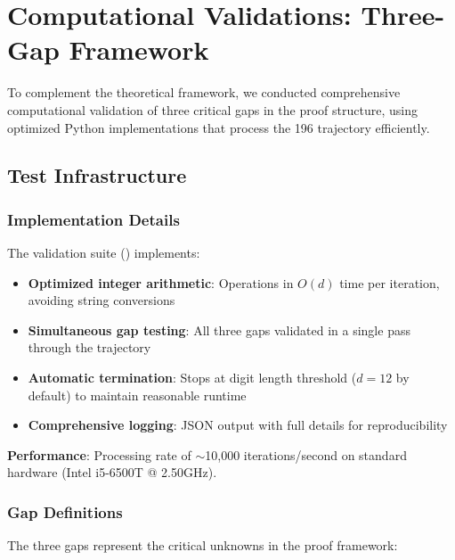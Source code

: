 \documentclass[12pt,a4paper]{article}
\begin{document}
\section{Computational Validations: Three-Gap Framework}
\label{sec:three_gap_validation}

To complement the theoretical framework, we conducted comprehensive 
computational validation of three critical gaps in the proof structure, 
using optimized Python implementations that process the 196 trajectory 
efficiently.

\subsection{Test Infrastructure}

\subsubsection{Implementation Details}

The validation suite (\texttt{}) implements:

\begin{itemize}
\item \textbf{Optimized integer arithmetic}: Operations in $O(d)$ time 
      per iteration, avoiding string conversions
      
\item \textbf{Simultaneous gap testing}: All three gaps validated in 
      a single pass through the trajectory
      
\item \textbf{Automatic termination}: Stops at digit length threshold 
      ($d = 12$ by default) to maintain reasonable runtime
      
\item \textbf{Comprehensive logging}: JSON output with full details 
      for reproducibility
\end{itemize}

\textbf{Performance}: Processing rate of $\sim$10,000 iterations/second 
on standard hardware (Intel i5-6500T @ 2.50GHz).

\subsubsection{Gap Definitions}

The three gaps represent the critical unknowns in the proof framework:
\end{document}
